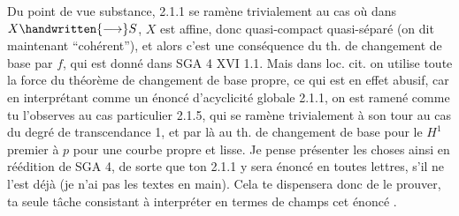 \reversemarginpar
{}
\normalmarginpar
{}

Du point de vue substance, 2.1.1 se ramène trivialement au cas où dans $X\handwritten{\longrightarrow}S$, $X$ est affine, donc quasi-compact quasi-séparé (on dit maintenant ``cohérent''), et alors c'est une conséquence du th. de changement de base par $f$, qui est donné dans SGA 4 XVI 1.1. Mais dans loc. cit. on utilise toute la force du théorème de changement de base propre, ce qui est en effet abusif, car en interprétant comme un énoncé d'acyclicité globale 2.1.1, on est ramené comme tu l'observes  au cas particulier 2.1.5, qui se ramène trivialement à son tour au cas du degré de transcendance 1, et par là au th. de changement de base pour le $H^1$ premier à $p$ pour une courbe propre et lisse. Je pense présenter les choses ainsi en réédition de SGA 4, de sorte que ton 2.1.1 y sera énoncé en toutes lettres, s'il ne l'est déjà (je n'ai pas les textes en main).
\reversemarginpar
{}
\normalmarginpar
Cela te dispensera donc de le prouver, ta seule tâche consistant à interpréter en termes de champs cet énoncé .

